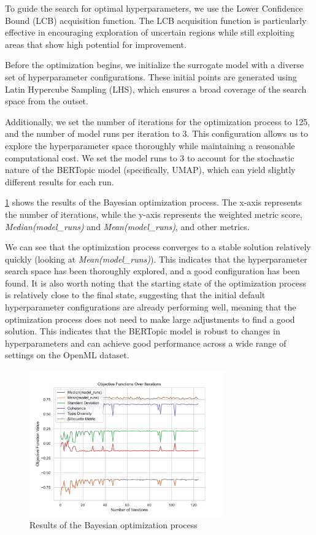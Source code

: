 To guide the search for optimal hyperparameters, we use the Lower Confidence Bound (LCB) acquisition function. The LCB acquisition function is particularly effective in encouraging exploration of uncertain regions while still exploiting areas that show high potential for improvement.

Before the optimization begins, we initialize the surrogate model with a diverse set of hyperparameter configurations. These initial points are generated using Latin Hypercube Sampling (LHS), which ensures a broad coverage of the search space from the outset.

Additionally, we set the number of iterations for the optimization process to 125, and the number of model runs per iteration to 3. This configuration allows us to explore the hyperparameter space thoroughly while maintaining a reasonable computational cost. We set the model runs to 3 to account for the stochastic nature of the BERTopic model (specifically, UMAP), which can yield slightly different results for each run.

\cref{fig:bayesian_optimization} shows the results of the Bayesian optimization process. The x-axis represents the number of iterations, while the y-axis represents the weighted metric score, \textit{Median(model\_runs)} and \textit{Mean(model\_runs)}, and other metrics. 

We can see that the optimization process converges to a stable solution relatively quickly (looking at \textit{Mean(model\_runs)}). This indicates that the hyperparameter search space has been thoroughly explored, and a good configuration has been found. It is also worth noting that the starting state of the optimization process is relatively close to the final state, suggesting that the initial default hyperparameter configurations are already performing well, meaning that the optimization process does not need to make large adjustments to find a good solution. This indicates that the BERTopic model is robust to changes in hyperparameters and can achieve good performance across a wide range of settings on the OpenML dataset.

\begin{figure}[h]
    \centering
    \includegraphics[width=0.75\textwidth]{figures/bayesian_optimization.pdf}
    \caption{Results of the Bayesian optimization process}
    \label{fig:bayesian_optimization}
\end{figure}

